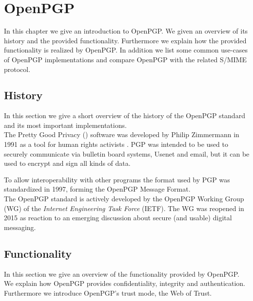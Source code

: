 \chapter{OpenPGP} \label{chapter:openpgp}

In this chapter we give an introduction to OpenPGP. We given an overview of its history and the provided functionality. Furthermore we explain how the provided functionality is realized by OpenPGP. In addition we list some common use-cases of OpenPGP implementations and compare OpenPGP with the related S/MIME protocol. 


\section{History}  \label{section:openpgp:history}

In this section we give a short overview of the history of the OpenPGP standard and its most important implementations. \\


The Pretty Good Privacy () software was developed by Philip Zimmermann in 1991 \cite{PGP1} as a tool for human rights activists \cite{PGP2}. PGP was intended to be used to securely communicate via bulletin board systems, Usenet and email, but it can be used to encrypt and sign all kinds of data.

To allow interoperability with other programs the format used by PGP was standardized in 1997, forming the OpenPGP Message Format. \\


The OpenPGP standard is actively developed by the OpenPGP Working Group (WG) of the \textit{Internet Engineering Task Force} (IETF). The WG was reopened in 2015 as reaction to an emerging discussion about secure (and usable) digital messaging.

\section{Functionality} \label{section:openpgp:functionality}

In this section we give an overview of the functionality provided by OpenPGP. We explain how OpenPGP provides confidentiality, integrity
and authentication. Furthermore we introduce OpenPGP's trust mode, the Web of Trust.  \\


